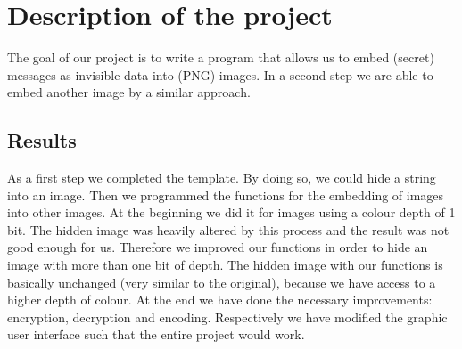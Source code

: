\documentclass[
parskip=full,               %
12pt,                       %
twoside,                    %
a4paper                     %
]{article}
\begin{document}
\begin{titlepage}



 

\vfill %

\end{titlepage}	
	\section{Description of the project}
	The goal of our project is to write a program that allows us to embed (secret) 
	messages as invisible data into (PNG) images. In a second step we are able to 
	embed another image by a similar approach. 

	\subsection{Results}
	 As a first step we completed the template. By doing so, we could hide a string into an image.
Then we programmed the functions for the embedding of images into other images. At the beginning we did it for images using a colour depth of 1 bit. The hidden image was heavily altered by this process and the result was not good enough for us. Therefore we improved our functions in order to hide an image with more than one bit of depth. The hidden image with our functions is basically unchanged (very similar to the original), because we have access to a higher depth of colour.
At the end we have done the necessary improvements: encryption, decryption and encoding.
Respectively we have modified the graphic user interface such that the entire project would work.

	
\end{document}
